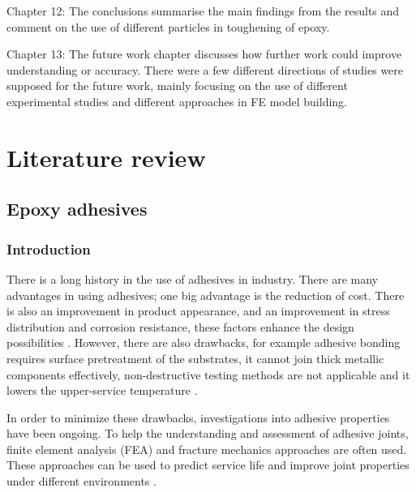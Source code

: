 \documentclass[numbers=noendperiod,chapterprefix=on]{icldt} %
\begin{document}
Chapter 12: The conclusions summarise the main findings from the results and comment on the use of different particles in toughening of epoxy.

Chapter 13: The future work chapter discusses how further work could improve understanding or accuracy. 
There were a few different directions of studies were supposed for the future work, mainly focusing on the use of different experimental studies and different approaches in FE model building. 

%

\chapter{Literature review} 
\section{Epoxy adhesives}
\subsection{Introduction}
There is a long history in the use of adhesives in industry. There are many advantages in using adhesives; one big advantage is the reduction of cost. There is also an improvement in product appearance, and an improvement in stress distribution and corrosion resistance, these factors enhance the design possibilities \cite{Kinloch1997}. However, there are also drawbacks, for example adhesive bonding requires surface pretreatment of the substrates, it cannot join thick metallic components effectively, non-destructive testing methods are not applicable and it lowers the upper-service temperature  \cite{Kinloch1997}.

In order to minimize these drawbacks, investigations into adhesive properties have been ongoing. To help the understanding and assessment of adhesive joints, finite element analysis (FEA) and fracture mechanics approaches are often used. These approaches can be used to predict service life and improve joint properties under different environments \cite{Kinloch1997}.
\end{document}
